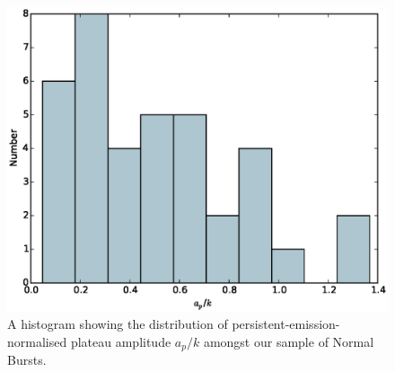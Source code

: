 \begin{figure}
  \centering
  \includegraphics[width=.9\linewidth, trim={0cm 0 0cm 0},clip]{images/appendix_plat_pa_n_hist.eps}
  \caption{\small A histogram showing the distribution of persistent-emission-normalised plateau amplitude $a_p/k$ amongst our sample of Normal Bursts.}
  \label{fig:app_hist_ap_n}
\end{figure}
